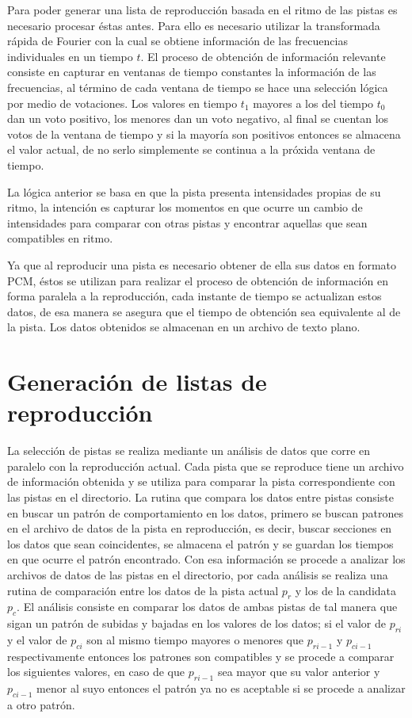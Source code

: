 Para poder generar una lista de reproducci\'on basada en el ritmo de las pistas es necesario procesar \'estas antes. Para ello es necesario utilizar la transformada r\'apida de Fourier con la cual se obtiene informaci\'on de las frecuencias individuales en un tiempo $t$. El proceso de obtenci\'on de informaci\'on relevante consiste en capturar en ventanas de tiempo constantes la informaci\'on de las frecuencias, al t\'ermino de cada ventana de tiempo se hace una selecci\'on l\'ogica por medio de votaciones. Los valores en tiempo $t_1$ mayores a los del tiempo $t_0$ dan un voto positivo, los menores dan un voto negativo, al final se cuentan los votos de la ventana de tiempo y si la mayor\'ia son positivos entonces se almacena el valor actual, de no serlo simplemente se continua a la pr\'oxida ventana de tiempo.

\noindent La l\'ogica anterior se basa en que la pista presenta intensidades propias de su ritmo, la intenci\'on es capturar los momentos en que ocurre un cambio de intensidades para comparar con otras pistas y encontrar aquellas que sean compatibles en ritmo.

\noindent Ya que al reproducir una pista es necesario obtener de ella sus datos en formato PCM, \'estos se utilizan para realizar el proceso de obtenci\'on de informaci\'on en forma paralela a la reproducci\'on, cada instante de tiempo se actualizan estos datos, de esa manera se asegura que el tiempo de obtenci\'on sea equivalente al de la pista. Los datos obtenidos se almacenan en un archivo de texto plano.



\section{Generaci\'on de listas de reproducci\'on}

La selecci\'on de pistas se realiza mediante un an\'alisis de datos que corre en paralelo con la reproducci\'on actual. Cada pista que se reproduce tiene un archivo de informaci\'on obtenida y se utiliza para comparar la pista correspondiente con las pistas en el directorio. La rutina que compara los datos entre pistas consiste en buscar un patr\'on de comportamiento en los datos, primero se buscan patrones en el archivo de datos de la pista en reproducci\'on, es decir, buscar secciones en los datos que sean coincidentes, se almacena el patr\'on y se guardan los tiempos en que ocurre el patr\'on encontrado. Con esa informaci\'on se procede a analizar los archivos de datos de las pistas en el directorio, por cada an\'alisis se realiza una rutina de comparaci\'on entre los datos de la pista actual $p_r$ y los de la candidata $p_c$. El an\'alisis consiste en comparar los datos de ambas pistas de tal manera que sigan un patr\'on de subidas y bajadas en los valores de los datos; si el valor de $p_{ri}$ y el valor de $p_{ci}$ son al mismo tiempo mayores o menores que $p_{ri-1}$ y $p_{ci-1}$ respectivamente entonces los patrones son compatibles y se procede a comparar los siguientes valores, en caso de que $p_{ri-1}$ sea mayor que su valor anterior y $p_{ci-1}$ menor al suyo entonces el patr\'on ya no es aceptable si se procede a analizar a otro patr\'on.

